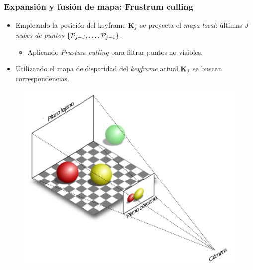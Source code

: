 \documentclass[compress]{beamer}
\begin{document}
\begin{frame}
	\frametitle{Expansión y fusión de mapa: Frustrum culling}
	\begin{itemize}
		\item Empleando la posición del keyframe $\boldsymbol{\mathbf{K}}_{j}$ se proyecta el \emph{mapa local}: últimas $J$ \emph{nubes de puntos} $\left\{ \mathcal P_{j-J},\hdots,\mathcal P_{j-1}\right\}$.
		\begin{itemize}
			\item Aplicando \emph{Frustum culling} para filtrar puntos no-visibles.
		\end{itemize}
	\item Utilizando el mapa de disparidad del \emph{keyframe} actual $\boldsymbol{\mathbf{K}}_{j}$ se buscan correspondencias.
	\end{itemize}
	
	\begin{figure}[htb]
		\centering
		\includegraphics[width=0.6\columnwidth]{method/frustum_culling.pdf}
	\end{figure}

\end{frame}


\end{document}
